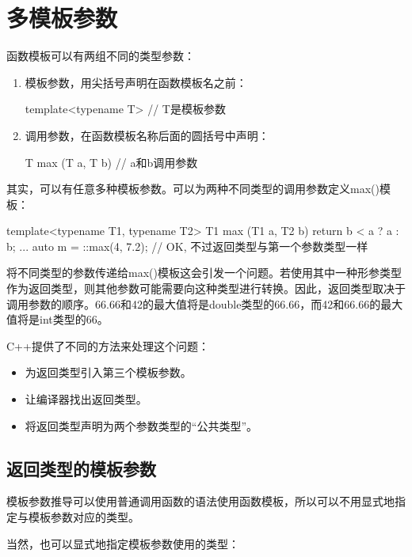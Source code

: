 \section{多模板参数}

函数模板可以有两组不同的类型参数：

\begin{enumerate}
\item 
模板参数，用尖括号声明在函数模板名之前：
\begin{cpp}
template<typename T> // T是模板参数
\end{cpp}

\item 
调用参数，在函数模板名称后面的圆括号中声明：
\begin{cpp}
T max (T a, T b) // a和b调用参数
\end{cpp}
\end{enumerate}

其实，可以有任意多种模板参数。可以为两种不同类型的调用参数定义max()模板：

\begin{cpp}
template<typename T1, typename T2>
T1 max (T1 a, T2 b) {
	return b < a ? a : b;
}
...
auto m = ::max(4, 7.2); // OK, 不过返回类型与第一个参数类型一样
\end{cpp}

将不同类型的参数传递给max()模板这会引发一个问题。若使用其中一种形参类型作为返回类型，则其他参数可能需要向这种类型进行转换。因此，返回类型取决于调用参数的顺序。66.66和42的最大值将是double类型的66.66，而42和66.66的最大值将是int类型的66。

C++提供了不同的方法来处理这个问题：

\begin{itemize}
\item
为返回类型引入第三个模板参数。

\item
让编译器找出返回类型。

\item
将返回类型声明为两个参数类型的“公共类型”。
\end{itemize}

\subsection{返回类型的模板参数}

模板参数推导可以使用普通调用函数的语法使用函数模板，所以可以不用显式地指定与模板参数对应的类型。

当然，也可以显式地指定模板参数使用的类型：

